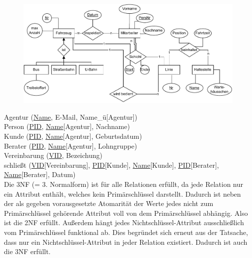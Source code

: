 \begin{aufgabe}%
\begin{figure}[h]
	\centering
	\includegraphics[scale=0.5]{F18Th1A2.pdf}
\end{figure}
	
\end{aufgabe}

\begin{aufgabe}%
Agentur (\underline{Name}, E-Mail, Name_ü[Agentur]) \\
Person (\underline{PID}, \underline{Name}[Agentur], Nachname) \\
Kunde (\underline{PID}, \underline{Name}[Agentur], Geburtsdatum) \\
Berater (\underline{PID}, \underline{Name}[Agentur], Lohngruppe) \\
Vereinbarung (\underline{VID}, Bezeichung) \\
schließt (\underline{VID}[Vereinbarung], \underline{PID}[Kunde], \underline{Name}[Kunde], \underline{PID}[Berater], \underline{Name}[Berater], Datum) \\ %
Die 3NF (= 3. Normalform) ist für alle Relationen erfüllt, da jede Relation nur ein Attribut enthält, welches kein Primärschlüssel darstellt. Dadurch ist neben der als gegeben vorausgesetzte Atomarität der Werte jedes nicht zum Primärschlüssel gehörende Attribut voll von dem Primärschlüssel abhängig. Also ist die 2NF erfüllt. Außerdem hängt jedes Nichtschlüssel-Attribut ausschließlich vom Primärschlüssel funktional ab. Dies begründet sich erneut aus der Tatsache, dass nur ein Nichtschlüssel-Attribut in jeder Relation existiert. Dadurch ist auch die 3NF erfüllt. %
	
\end{aufgabe}

